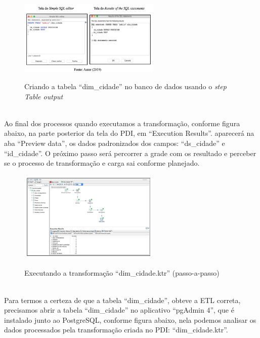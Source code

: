 \begin{figure}[H]
	\vspace*{0,2cm}
    \centering
    \caption{Criando a tabela ``dim\_cidade'' no banco de dados usando o \textit{step Table output}}
    \includegraphics[width=0.6\textwidth]{./04-figuras/figura-tb-dim-cidade}
    \label{fig:ilustfigtbdimcidade}
\end{figure}
\vspace*{-0,9cm}
{\raggedright {}} \\

Ao final dos processos quando executamos a transforma\c{c}\~{a}o, conforme figura abaixo, na parte posterior da tela do PDI, em ``Execution Results''. aparecer\'{a} na aba ``Preview data'', os dados padronizados dos campos: ``ds\_cidade'' e ``id\_cidade''. O pr\'oximo passo ser\'{a} percorrer a grade com os resultado e perceber se o processo de transforma\c{c}\~{a}o e carga sai conforme planejado. 

\begin{figure}[H]
	\vspace*{0,2cm}
    \centering
    \caption{Executando a transforma\c{c}\~{a}o ``dim\_cidade.ktr'' (passo-a-passo)}
    \includegraphics[width=0.6\textwidth]{./04-figuras/figura-exec-dim-cidade}
    \label{fig:ilustfigexecdimcidade}
\end{figure}
\vspace*{-0,9cm}
{\raggedright {}} \\

Para termos a certeza de que a tabela ``dim\_cidade'', obteve a ETL correta, precisamos abrir a tabela ``dim\_cidade'' no aplicativo ``pgAdmin 4'', que \'{e} instalado junto ao PostgreSQL, conforme figura abaixo, nela podemos analisar os dados processados pela transforma\c{c}\~{a}o criada no PDI: ``dim\_cidade.ktr''.

